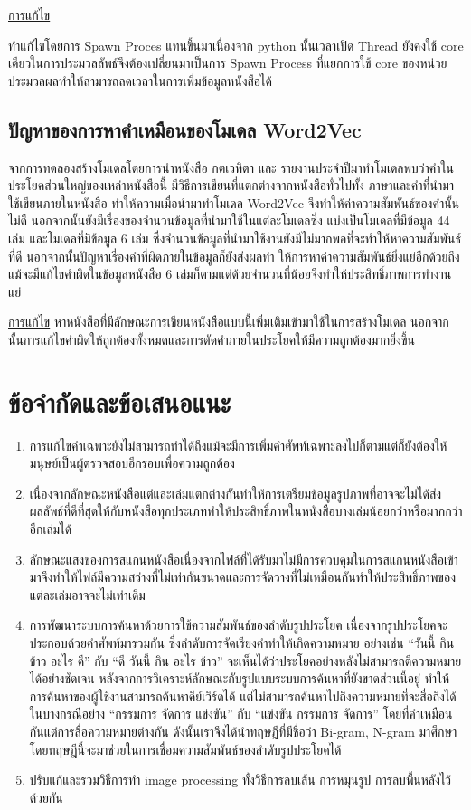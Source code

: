 \underline{การแก้ไข}

	ทำแก้ไขโดยการ Spawn Proces แทนขึ้นมาเนื่องจาก python นั้นเวลาเปิด Thread ยังคงใช้ core เดียวในการประมวลลัพธ์จึงต้องเปลี่ยนมาเป็นการ Spawn Process ที่แยกการใช้ core ของหน่วยประมวลผลทำให้สามารถลดเวลาในการเพิ่มข้อมูลหนังสือได้

\subsection{ปัญหาของการหาคำเหมือนของโมเดล Word2Vec}

	จากการทดลองสร้างโมเดลโดยการนำหนังสือ กตเวทิตา และ รายงานประจำปีมาทำโมเดลพบว่าคำในประโยคส่วนใหญ่ของเหล่าหนังสือนี้ มีวิธีการเขียนที่แตกต่างจากหนังสือทั่วไปทั้ง 
	ภาษาและคำที่นำมาใช้เขียนภายในหนังสือ ทำให้ความเมื่อนำมาทำโมเดล Word2Vec จึงทำให้ค่าความสัมพันธ์ของคำนั้นไม่ดี นอกจากนั้นยังมีเรื่องของจำนวนข้อมูลที่นำมาใช้ในแต่ละโมเดลซึ่ง 
	แบ่งเป็นโมเดลที่มีข้อมูล 44 เล่ม และโมเดลที่มีข้อมูล 6 เล่ม ซึ่งจำนวนข้อมูลที่นำมาใช้งานยังมีไม่มากพอที่จะทำให้หาความสัมพันธ์ที่ดี นอกจากนั้นปัญหาเรี่องคำที่ผิดภายในข้อมูลก็ยังส่งผลทำ
	ให้การหาค่าความสัมพันธ์ยิ่งแย่อีกด้วยถึงแม้จะมีแก้ไขคำผิดในข้อมูลหนังสือ 6 เล่มก็ตามแต่ด้วยจำนวนที่น้อยจึงทำให้ประสิทธิ์ภาพการทำงานแย่

\underline{การแก้ไข}	
หาหนังสือที่มีลักษณะการเขียนหนังสือแบบนี้เพิ่มเติมเข้ามาใช้ในการสร้างโมเดล นอกจากนั้นการแก้ไขคำผิดให้ถูกต้องทั้งหมดและการตัดคำภายในประโยคให้มีความถูกต้องมากยิ่งขึ้น

\section{ข้อจำกัดและข้อเสนอแนะ}
\begin{enumerate}
    \item การแก้ไขคำเฉพาะยังไม่สามารถทำได้ถึงแม้จะมีการเพิ่มคำศัพท์เฉพาะลงไปก็ตามแต่ก็ยังต้องให้มนุษย์เป็นผู้ตรวจสอบอีกรอบเพื่อความถูกต้อง
    \item เนื่องจากลักษณะหนังสือแต่และเล่มแตกต่างกันทำให้การเตรียมข้อมูลรูปภาพที่อาจจะไม่ได้ส่งผลลัพธ์ที่ดีที่สุดให้กับหนังสือทุกประเภททำให้ประสิทธิ์ภาพในหนังสือบางเล่มน้อยกว่าหรือมากกว่าอีกเล่มได้
    \item ลักษณะแสงของการสแกนหนังสือเนื่องจากไฟล์ที่ได้รับมาไม่มีการควบคุมในการสแกนหนังสือเข้ามาจึงทำให้ไฟล์มีความสว่างที่ไม่เท่ากันขนาดและการจัดวางที่ไม่เหมือนกันทำให้ประสิทธิ์ภาพของแต่ละเล่มอาจจะไม่เท่าเดิม
    \item การพัฒนาระบบการค้นหาด้วยการใช้ความสัมพันธ์ของลำดับรูปประโยค เนื่องจากรูปประโยคจะประกอบด้วยคำศัพท์มารวมกัน ซึ่งลำดับการจัดเรียงคำทำให้เกิดความหมาย อย่างเช่น “วันนี้ กิน ข้าว อะไร ดี” กับ “ดี วันนี้ กิน อะไร ข้าว” จะเห็นได้ว่าประโยคอย่างหลังไม่สามารถตีความหมายได้อย่างชัดเจน หลังจากการวิเคราะห์ลักษณะกับรูปแบบระบบการค้นหาที่ยังขาดส่วนนี้อยู่ ทำให้การค้นหาของผู้ใช้งานสามารถค้นหาคีย์เวิร์ดได้ แต่ไม่สามารถค้นหาไปถึงความหมายที่จะสื่อถึงได้ในบางกรณีอย่าง “กรรมการ จัดการ แข่งขัน” กับ “แข่งขัน กรรมการ จัดการ” โดยที่คำเหมือนกันแต่การสื่อความหมายต่างกัน ดังนั้นเราจึงได้นำทฤษฎีที่มีชื่อว่า Bi-gram, N-gram มาศึกษาโดยทฤษฎีนี้จะมาช่วยในการเชื่อมความสัมพันธ์ของลำดับรูปประโยคได้
    \item ปรับแก้และรวมวิธีการทำ image processing ทั้งวิธีการลบเส้น การหมุนรูป การลบพื้นหลังไว้ด้วยกัน
\end{enumerate}
